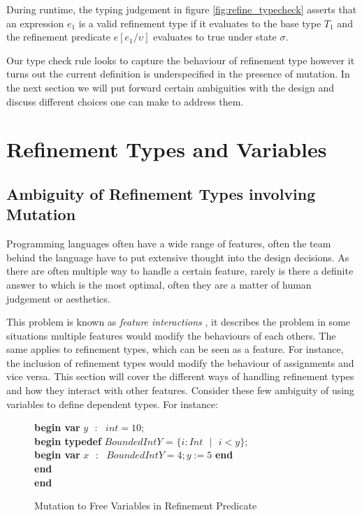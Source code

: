 \documentclass[a4paper,12pt]{report}
\newenvironment{tabs}[1]
 {\flushleft\TabPositions{#1}}
 {\endflushleft}
\begin{document}
\par
During runtime, the typing judgement in figure \ref{fig:refine_typecheck} 
asserts that an expression $e_1$ is a valid refinement type if it 
evaluates to the base type $T_1$ and the refinement predicate $e[e_1/\upsilon]$ 
evaluates to true under state $\sigma$.

\par
Our type check rule looks to capture the behaviour of refinement type however it 
turns out the current definition is underspecified in the presence of mutation. 
In the next section we will put forward certain ambiguities with the 
design and discuss different choices one can make to address them.

\section{Refinement Types and Variables}
\subsection{Ambiguity of Refinement Types involving Mutation}
Programming languages often have a wide range of features, often the team behind 
the language have to put extensive thought into the design decisions. As there 
are often multiple way to handle a certain feature, rarely is there a definite 
answer to which is the most optimal, often they are a matter of human judgement 
or aesthetics. 

\par
This problem is known as \textit{feature interactions} 
\cite{featInteract}, it describes the problem in some situations multiple 
features would modify the behaviours of each others. The same applies to 
refinement types, which can be seen as a feature. For instance, the inclusion 
of refinement types would modify the behaviour of assignments and vice versa. 
This section will cover the different ways of handling refinement types and how 
they interact with other features.
Consider these few ambiguity of using variables to define dependent types. For 
instance: 

\begin{figure} [H]
  \begin{tabs}{1cm,2cm}
    \textbf{begin var }$y\text{ }:\text{ } int = 10;$ \\
    \tab\textbf{begin typedef }$BoundedIntY$ = $\{i : Int\text{ }|\text{ } i < y\}$; \\ 
    \tab\tab\textbf{begin var }$x\text{ }:\text{ }BoundedIntY = 4;y := 5$\textbf { end} \\
    \tab\textbf {end} \\
    \textbf{end}
  \end{tabs}  
  \caption{Mutation to Free Variables in Refinement Predicate}
  \label{fig:amb_refinement_vars}
\end{figure}
\end{document}
